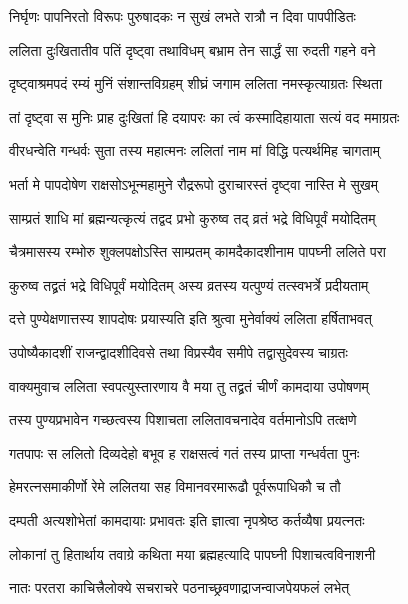 \twolineshloka
{निर्घृणः पापनिरतो विरूपः पुरुषादकः}
{न सुखं लभते रात्रौ न दिवा पापपीडितः}%

\twolineshloka
{ललिता दुःखितातीव पतिं दृष्ट्वा तथाविधम्}
{बभ्राम तेन सार्द्धं सा रुदती गहने वने}%

\twolineshloka
{दृष्ट्वाश्रमपदं रम्यं मुनिं संशान्तविग्रहम्}
{शीघ्रं जगाम ललिता नमस्कृत्याग्रतः स्थिता}%

\twolineshloka
{तां दृष्ट्वा स मुनिः प्राह दुःखितां हि दयापरः}
{का त्वं कस्मादिहायाता सत्यं वद ममाग्रतः}%


\twolineshloka
{वीरधन्वेति गन्धर्वः सुता तस्य महात्मनः}
{ललितां नाम मां विद्धि पत्यर्थमिह चागताम्}%

\twolineshloka
{भर्ता मे पापदोषेण राक्षसोऽभून्महामुने}
{रौद्ररूपो दुराचारस्तं दृष्ट्वा नास्ति मे सुखम्}%

\twolineshloka
{साम्प्रतं शाधि मां ब्रह्मन्यत्कृत्यं तद्वद प्रभो}
{कुरुष्व तद् व्रतं भद्रे विधिपूर्वं मयोदितम्}%


\twolineshloka
{चैत्रमासस्य रम्भोरु शुक्लपक्षोऽस्ति साम्प्रतम्}
{कामदैकादशीनाम पापघ्नी ललिते परा}%

\twolineshloka
{कुरुष्व तद्व्रतं भद्रे विधिपूर्वं मयोदितम्}
{अस्य व्रतस्य यत्पुण्यं तत्स्वभर्त्रे प्रदीयताम्}%

\twolineshloka
{दत्ते पुण्येक्षणात्तस्य शापदोषः प्रयास्यति}
{इति श्रुत्वा मुनेर्वाक्यं ललिता हर्षिताभवत्}%

\twolineshloka
{उपोष्यैकादशीं राजन्द्वादशीदिवसे तथा}
{विप्रस्यैव समीपे तद्वासुदेवस्य चाग्रतः}%

\twolineshloka
{वाक्यमुवाच ललिता स्वपत्युस्तारणाय वै}
{मया तु तद्व्रतं चीर्णं कामदाया उपोषणम्}%

\twolineshloka
{तस्य पुण्यप्रभावेन गच्छत्वस्य पिशाचता}
{ललितावचनादेव वर्तमानोऽपि तत्क्षणे}%

\twolineshloka
{गतपापः स ललितो दिव्यदेहो बभूव ह}
{राक्षसत्वं गतं तस्य प्राप्ता गन्धर्वता पुनः}%

\twolineshloka
{हेमरत्नसमाकीर्णो रेमे ललितया सह}
{विमानवरमारूढौ पूर्वरूपाधिकौ च तौ}%

\twolineshloka
{दम्पती अत्यशोभेतां कामदायाः प्रभावतः}
{इति ज्ञात्वा नृपश्रेष्ठ कर्तव्यैषा प्रयत्नतः}%

\twolineshloka
{लोकानां तु हितार्थाय तवाग्रे कथिता मया}
{ब्रह्महत्यादि पापघ्नी पिशाचत्वविनाशनी}%

\twolineshloka
{नातः परतरा काचित्त्रैलोक्ये सचराचरे}
{पठनाच्छ्रवणाद्राजन्वाजपेयफलं लभेत्}%

